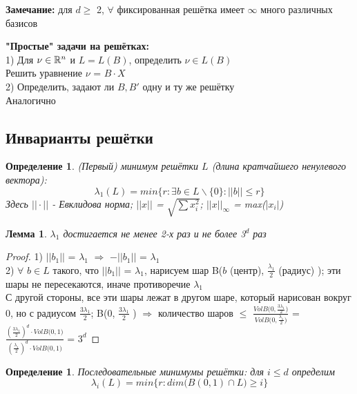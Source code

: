\documentclass[11pt]{article}
\newtheorem{lemma}{Лемма} %
\newtheorem{definition}[theorem]{Определение}
\begin{document}
\textbf{Замечание:} для $d \geq$ 2, $\forall$ фиксированная решётка имеет $\infty$ много различных базисов


\textbf{"Простые" задачи на решётках:}\\
1) Для $\nu \in {{\mathbb R}}^n$ и $L = L(B)$, определить $\nu \in L(B)$\\
Решить уравнение $\nu$ = $B \cdot X$\\

2) Определить, задают ли $B, B'$ одну и ту же решётку\\
Аналогично

\subsection{Инварианты решётки}

\begin{definition} \label{thm:Invariant}
	(Первый) минимум решётки $L$ (длина кратчайшего ненулевого вектора):
\[
	\lambda_1(L) = min \{ r : \exists b \in L \backslash \{0\} : ||b|| \leq r\}
\]
	Здесь $||\cdot||$ - Евклидова норма; $||x||$ = $\sqrt{\sum x_i^2}$;  $||x||_\infty$ = max\big($|x_i|$\big)
\end{definition}

\begin{lemma} \label{lem:Lemma2}
	$\lambda_1$ достигается не менее 2-х раз и не более 3$^d$ раз
\end{lemma}

\begin{proof}
	1) $||b_1||$ = $\lambda_1$ $\Rightarrow$ $-||b_1||$ = $\lambda_1$\\
	2) $\forall$ $b \in L$ такого, что $||b_1||$ = $\lambda_1$, нарисуем шар B\Bigg($b$ (центр), $\frac{\lambda_1}{2}$ (радиус) \Bigg); эти шары не пересекаются, иначе противоречие  $\lambda_1$\\
	С другой стороны, все эти шары лежат в другом шаре, который нарисован вокруг 0, но с радиусом $\frac{3\lambda_1}{2}$; B\Bigg(0, $\frac{3\lambda_1}{2}$ \Bigg) $\Rightarrow$ количество шаров $\leq$ $\frac{VolB\Big(0, \frac{3\lambda_1}{2}\Big)}{VolB\Big(0, \frac{\lambda_1}{2}\Big)}$ = $\frac{(\frac{3\lambda_1}{2})^d \cdot VolB\Big(0, 1 \Big)}{(\frac{\lambda_1}{2})^d \cdot VolB\Big(0, 1 \Big)}$ = $3^d$
\end{proof}

\begin{definition} \label{thm:Minimum}
	Последовательные минимумы решётки: для $i \leq d$ определим
\[
	\lambda_i(L) = min \{ r : dim \big( B(0,1) \cap L \big) \geq i \}
\]
\end{definition}
\end{document}

